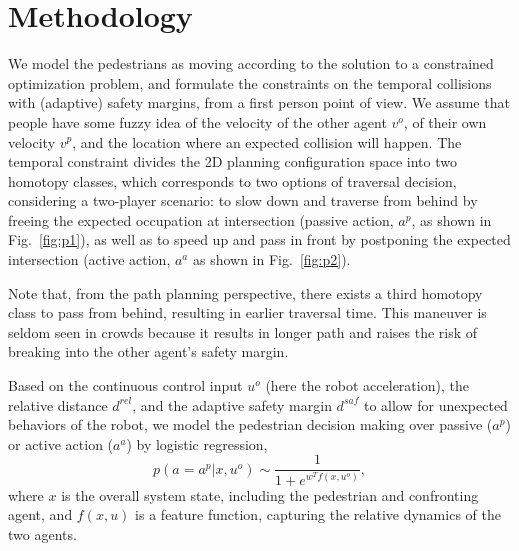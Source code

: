 \documentclass[conference]{IEEEtran}
\begin{document}
\section{Methodology}
\vspace{-0.4em}
We model the pedestrians as moving according to the solution to a constrained optimization 
problem, and formulate the constraints on the temporal collisions with 
(adaptive) safety margins, from a first person point of view. We assume that 
people have some fuzzy idea of the velocity of the other agent $v^o$, of their 
own velocity $v^p$, and the location where an expected collision will happen. 
The temporal constraint divides the 2D planning configuration space into two 
homotopy classes, which corresponds to two options of traversal decision, 
considering a two-player scenario: to slow down and traverse from behind by 
freeing the expected occupation at intersection (passive action, $a^{p}$, as 
shown in Fig.~\ref{fig:p1}), as well as to speed up and pass in front by postponing 
the expected intersection (active action, $a^a$ as shown in Fig.~\ref{fig:p2}).   

Note that, from the path planning perspective, there exists a third homotopy 
class to pass from behind,
resulting in earlier traversal time. This maneuver is seldom seen in 
crowds because it results in longer path and raises the risk of breaking into the 
other agent's safety margin. 

Based on the continuous control input $u^o$ (here the robot acceleration), the 
relative distance $d^{rel}$, and the adaptive safety margin $d^{saf}$ to 
allow for unexpected behaviors of the robot, we model the pedestrian 
decision making over passive ($a^p$) or active action ($a^a$) by logistic regression,
\begin{equation}
p(a=a^p|x,u^o) \sim \frac{1}{1+e^{w^Tf(x,u^o)}}, 
\end{equation}
where $x$ is the overall system state, including the pedestrian and confronting agent, and $f(x,u)$ is a feature function, capturing the relative dynamics of the two agents.
\end{document}
